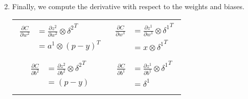 \begin{enumerate}
\begin{equation}
\begin{split}
						\end{split}
					\end{equation}
				\item Finally, we compute the derivative with respect to the weights and biases.
				\begin{tabular}{c|c}
					\parbox{14em}{
						\begin{equation}
							\begin{split}
								\frac{\partial C}{\partial w^2}
								&= \frac{\partial z^2}{\partial w^2} \otimes {\delta^2}^T \\
								&= a^1 \otimes {(p - y)}^T \\
							\end{split}
							\label{eq:BP_w2}
						\end{equation}
					} & \parbox{14em}{
						\begin{equation}
							\begin{split}
								\frac{\partial C}{\partial w^1}
								&= \frac{\partial z^1}{\partial w^1} \otimes {\delta^1}^T \\
								&= x \otimes {\delta^1}^T \\
								\label{eq:BP_w1}
							\end{split}
						\end{equation}
					} \\
					\parbox{14em}{
						\begin{equation}
							\begin{split}
								\frac{\partial C}{\partial b^2}
								&= \frac{\partial z^2}{\partial b^2} \otimes {\delta^2}^T \\
								&= (p - y) \\
								\label{eq:BP_b2}
							\end{split}
						\end{equation}
					} & \parbox{14em}{
						\begin{equation}
							\begin{split}
								\frac{\partial C}{\partial b^1}
								&= \frac{\partial z^1}{\partial b^1} \otimes {\delta^1}^T \\
								&= \delta^1 \\
								\label{eq:BP_b1}
							\end{split}
						\end{equation}
					}
				\end{tabular}
			\end{enumerate}




